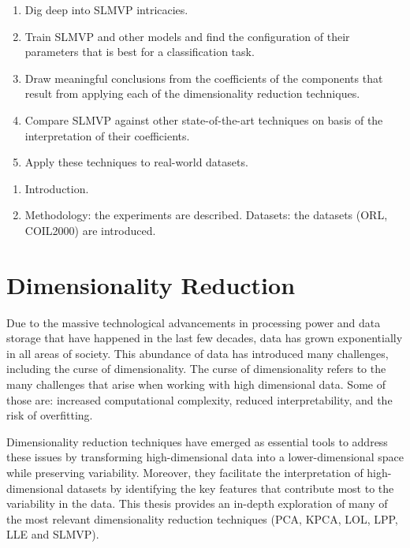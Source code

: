 
\begin{enumerate}
    \item Dig deep into SLMVP intricacies.
    \item Train SLMVP and other models and find the configuration of their parameters that is best for a classification task.
    \item Draw meaningful conclusions from the coefficients of the components that result from applying each of the dimensionality reduction techniques.
    \item Compare SLMVP against other state-of-the-art techniques on basis of the interpretation of their coefficients.
    \item Apply these techniques to real-world datasets.
\end{enumerate}

\begin{enumerate}
    \item Introduction.
    \item Methodology: the experiments are described.
          \subitem Datasets: the datasets (ORL, COIL2000) are introduced.
\end{enumerate}

\section{Dimensionality Reduction}
Due to the massive technological advancements in processing power and data storage that have happened in the last few decades, data has grown exponentially in all areas of society. This abundance of data has introduced many challenges, including the curse of dimensionality. The curse of dimensionality refers to the many challenges that arise when working with high dimensional data. Some of those are: increased computational complexity, reduced interpretability, and the risk of overfitting.

Dimensionality reduction techniques have emerged as essential tools to address these issues by transforming high-dimensional data into a lower-dimensional space while preserving variability. Moreover, they facilitate the interpretation of high-dimensional datasets by identifying the key features that contribute most to the variability in the data.
This thesis provides an in-depth exploration of many of the most relevant dimensionality reduction techniques (PCA, KPCA, LOL, LPP, LLE and SLMVP).

